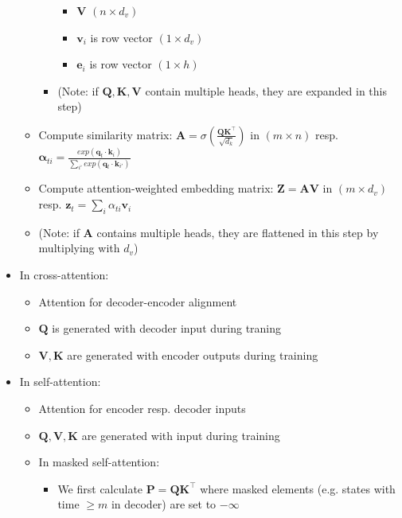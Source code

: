 \begin{itemize}
\begin{itemize}
\begin{itemize}
\begin{itemize}
                \item $\boldsymbol{V}$ $(n \times d_v)$
                \item $\boldsymbol{v}_i$ is row vector $(1 \times d_v)$
                \item $\boldsymbol{e}_i$ is row vector $(1 \times h)$
            \end{itemize}
            \item (Note: if $\boldsymbol{Q,K,V}$ contain multiple heads, they are expanded in this step)
        \end{itemize}
        \item Compute similarity matrix: $\boldsymbol{A} = \sigma(\frac{\boldsymbol{Q}\boldsymbol{K}^\intercal}{\sqrt{d_k}})$ in $(m \times n)$ resp. $\boldsymbol{\alpha}_{ti} = \frac{exp( \boldsymbol{q}_t \cdot \boldsymbol{k}_i )}{\sum_{i'} exp( \boldsymbol{q}_t \cdot \boldsymbol{k}_{i'} )}$
        \item Compute attention-weighted embedding matrix: $\boldsymbol{Z} = \boldsymbol{A}\boldsymbol{V}$ in $(m \times d_v)$ resp. $\boldsymbol{z}_t = \sum_i \alpha_{ti} \boldsymbol{v}_i$ 
        \item (Note: if $\boldsymbol{A}$ contains multiple heads, they are flattened in this step by multiplying with $d_v$)
    \end{itemize}
    \item In cross-attention:
    \begin{itemize}
        \item Attention for decoder-encoder alignment
        \item $\boldsymbol{Q}$ is generated with decoder input during traning
        \item $\boldsymbol{V},\boldsymbol{K}$ are generated with encoder outputs during training
    \end{itemize}
    \item In self-attention:
    \begin{itemize}
        \item Attention for encoder resp. decoder inputs
        \item $\boldsymbol{Q}, \boldsymbol{V},\boldsymbol{K}$ are generated with input during training
        \item In masked self-attention:
        \begin{itemize}
            \item We first calculate $\boldsymbol{P} =\boldsymbol{Q}\boldsymbol{K}^\intercal$ where masked elements (e.g. states with time $\geq m$ in decoder) are set to $-\infty$

\end{itemize}
\end{itemize}
\end{itemize}
